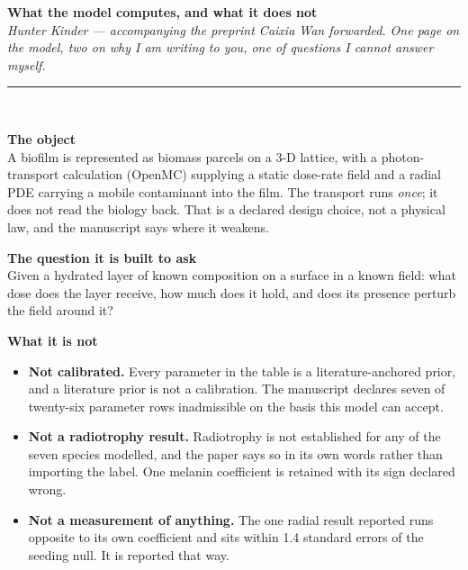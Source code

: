 \documentclass[landscape,12pt]{article}
\newcommand{\pagehead}[2]{%
  {\Large\bfseries #1}\\[1pt]
  {\small\itshape #2}\\[-4pt]
  \rule{\linewidth}{0.6pt}\\[4pt]}
\begin{document}
\pagehead{What the model computes, and what it does not}%
{Hunter Kinder --- accompanying the preprint Caixia Wan forwarded. One page on the model, two on
why I am writing to you, one of questions I cannot answer myself.}

\vspace{2mm}
\begin{minipage}[t]{0.485\linewidth}
{\large\bfseries\color{model} The object}\\[3pt]
A biofilm is represented as biomass parcels on a 3-D lattice, with a photon-transport calculation
(OpenMC) supplying a static dose-rate field and a radial PDE carrying a mobile contaminant into
the film. The transport runs \emph{once}; it does not read the biology back. That is a declared
design choice, not a physical law, and the manuscript says where it weakens.

\vspace{2mm}
{\large\bfseries\color{model} The question it is built to ask}\\[3pt]
Given a hydrated layer of known composition on a surface in a known field: what dose does the
layer receive, how much does it hold, and does its presence perturb the field around it?

\vspace{2mm}
{\large\bfseries\color{phys} What it is not}\\[3pt]
\begin{itemize}
  \item \textbf{Not calibrated.} Every parameter in the table is a literature-anchored prior, and
        a literature prior is not a calibration. The manuscript declares seven of twenty-six
        parameter rows inadmissible on the basis this model can accept.
  \item \textbf{Not a radiotrophy result.} Radiotrophy is not established for any of the seven
        species modelled, and the paper says so in its own words rather than importing the label.
        One melanin coefficient is retained with its sign declared wrong.
  \item \textbf{Not a measurement of anything.} The one radial result reported runs opposite to
        its own coefficient and sits within 1.4 standard errors of the seeding null. It is
        reported that way.
\end{itemize}
\end{minipage}\hfill
\end{document}
